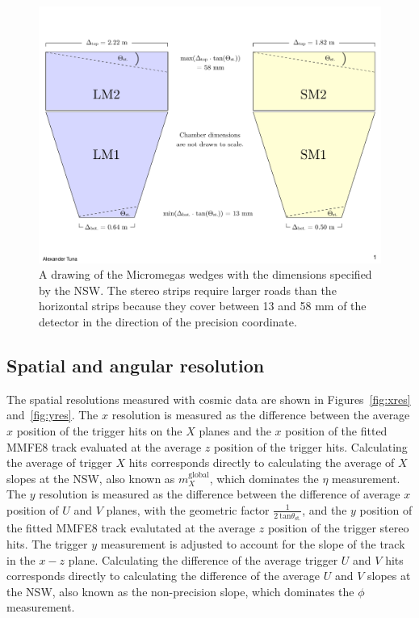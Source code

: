 \begin{figure}[!htpb]
  \begin{center}
    \includegraphics[width=1.0\textwidth]{figures/cartoons/stereo_roads.pdf}
  \end{center}
  \vspace{-10pt}
  \caption{A drawing of the Micromegas wedges with the dimensions specified by the NSW. The stereo strips require larger roads than the horizontal strips because they cover between 13 and 58 mm of the detector in the direction of the precision coordinate.}
  \label{fig:stereo_roads}
\end{figure}

\subsection{Spatial and angular resolution}
\label{sec:perf-res}

The spatial resolutions measured with cosmic data are shown in Figures~\ref{fig:xres} and~\ref{fig:yres}. The $x$ resolution is measured as the difference between the average $x$ position of the trigger hits on the $X$ planes and the $x$ position of the fitted MMFE8 track evaluated at the average $z$ position of the trigger hits. Calculating the average of trigger $X$ hits corresponds directly to calculating the average of $X$ slopes at the NSW, also known as $m_X^\text{global}$, which dominates the $\eta$ measurement. The $y$ resolution is measured as the difference between the difference of average $x$ position of $U$ and $V$ planes, with the geometric factor $\frac{1}{2\ \text{tan}\theta_\text{st.}}$, and the $y$ position of the fitted MMFE8 track evalutated at the average $z$ position of the trigger stereo hits. The trigger $y$ measurement is adjusted to account for the slope of the track in the $x-z$ plane. Calculating the difference of the average trigger $U$ and $V$ hits corresponds directly to calculating the difference of the average $U$ and $V$ slopes at the NSW, also known as the non-precision slope, which dominates the $\phi$ measurement.

